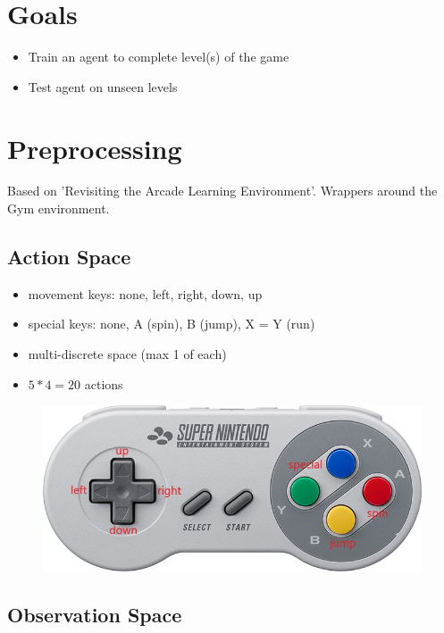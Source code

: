 \documentclass{article}
\begin{document}
    \section{Goals}
    \begin{itemize}
        \item Train an agent to complete level(s) of the game
        \item Test agent on unseen levels
    \end{itemize}

    \section{Preprocessing}
    Based on 'Revisiting the Arcade Learning Environment'.
    Wrappers around the Gym environment.
    \subsection{Action Space}
    \begin{itemize}
        \item movement keys: none, left, right, down, up
        \item special keys: none, A (spin), B (jump), X = Y (run)
        \item multi-discrete space (max 1 of each)
        \item $5*4=20$ actions
    \end{itemize}
    \begin{figure}[H]
        \centering
        \includegraphics[width=.85\textwidth]{snes-controller-annot}
    \end{figure}
    \subsection{Observation Space}
\end{document}
